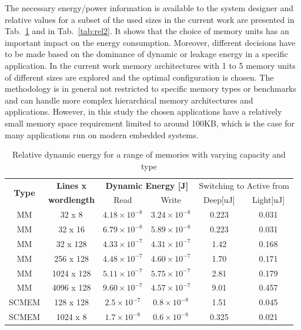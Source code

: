 \documentclass[smallcondensed]{svjour3}
\begin{document}
The necessary energy/power information is available to the system designer and relative values for a subset of the used sizes in the current work are presented in Tab.~\ref{tab:rel1} and in Tab.~\ref{tab:rel2}. 
It shows that the choice of memory units has an important impact on the energy consumption. 
Moreover, different decisions have to be made based on the dominance of dynamic or leakage energy in a specific application. 
In the current work memory architectures with 1 to 5 memory units  of different sizes are explored and the optimal configuration is chosen. 
The methodology is in general not restricted to specific memory types or benchmarks and can handle more complex hierarchical memory architectures and applications. 
However, in this study the chosen applications have a relatively small memory space requirement limited to around 100KB, which is the case for many applications run on modern embedded systems. 

\begin{table}
	\caption{Relative dynamic energy for a range of memories with varying capacity and type}
	\label{tab:rel1}
	\begin{tabular}{|c|c|c|c|c|c|}
		\hline
		\multirow{2}{*}{\textbf{Type}} & \textbf{Lines x} & \multicolumn{2}{c|}{\textbf{Dynamic Energy [J]}} & \multicolumn{2}{c|}{Switching to Active from} \\ \cline{3-4}
		& \textbf{wordlength} & Read & Write  & Deep[uJ] & Light[uJ]\\ 
		\hline 
		MM & 32 x 8 &  $ 4.18 \times 10^{-8} $ &  $ 3.24 \times 10^{-8} $ & 0.223 &  0.031 \\ 
		\hline
		MM & 32 x 16 & $  6.79 \times 10^{-8} $ &  $ 5.89 \times 10^{-8} $ & 0.223 &  0.031\\ 
		\hline
		MM & 32 x 128 & $  4.33 \times 10^{-7} $ &  $ 4.31 \times 10^{-7} $ & 1.42 & 0.168\\ 
		\hline
		MM & 256 x 128 & $  4.48 \times 10^{-7} $ &  $ 4.60 \times 10^{-7} $ & 1.70 &  0.171\\ 
		\hline
		MM & 1024 x 128 & $  5.11 \times 10^{-7} $ &  $ 5.75 \times 10^{-7} $ & 2.81 & 0.179\\ 
		\hline
		MM & 4096 x 128 & $  9.60 \times 10^{-7} $ &  $ 4.57 \times 10^{-7} $ & 9.01 & 0.457\\ 
		\hline
		SCMEM & 128 x 128 & $  2.5 \times 10^{-7} $ &  $ 0.8 \times 10^{-8} $ & 1.51 &  0.045\\ 
		\hline
		SCMEM & 1024 x 8 & $  1.7 \times 10^{-8} $ &  $ 0.6 \times 10^{-8} $ & 0.325 &  0.021\\ 
		\hline
	\end{tabular}
\end{table}
\end{document}

